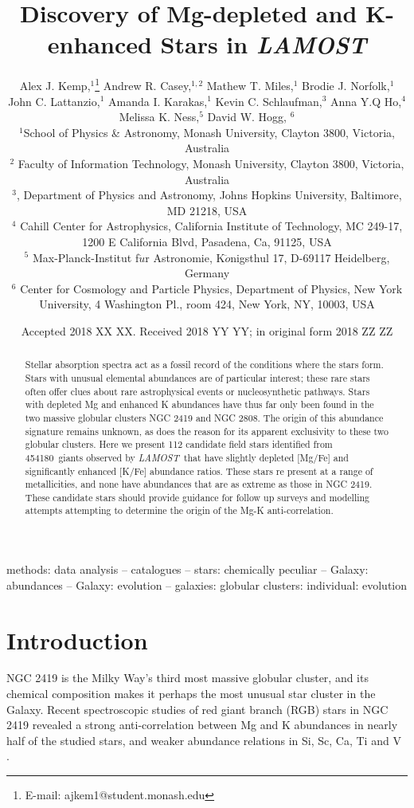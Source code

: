 \documentclass[a4paper,fleqn,usenatbib]{mnras}
\title[Mg-K anti-correlation in LAMOST]{Discovery of Mg-depleted and K-enhanced Stars in \textit{LAMOST}}
\author[Kemp et al.]{
Alex J. Kemp,$^{1}$\thanks{E-mail: ajkem1@student.monash.edu}
Andrew R. Casey,$^{1,2}$
Mathew T. Miles,$^{1}$
Brodie J. Norfolk,$^{1}$\newauthor
John C. Lattanzio,$^{1}$
Amanda I. Karakas,$^{1}$
Kevin C. Schlaufman,$^{3}$\newauthor
Anna Y.Q Ho,$^{4}$
Melissa K. Ness,$^{5}$
David W. Hogg, $^{6}$
\\
$^{1}$School of Physics \& Astronomy, Monash University, Clayton 3800, Victoria, Australia\\
$^{2}$ Faculty of Information Technology, Monash University, Clayton 3800, Victoria, Australia\\
$^{3}$, Department of Physics and Astronomy, Johns Hopkins University, Baltimore, MD 21218, USA\\
$^{4}$ Cahill Center for Astrophysics, California Institute of Technology, MC 249-17, 1200 E California Blvd, Pasadena, Ca, 91125, USA\\
$^{5}$ Max-Planck-Institut f$\ddot{u}$r Astronomie, K$\ddot{o}$nigsthul 17, D-69117 Heidelberg, Germany\\
$^{6}$ Center for Cosmology and Particle Physics, Department of Physics, New York University, 4 Washington Pl., room 424, New York, NY, 10003, USA\\
}
\date{Accepted 2018 XX XX. Received 2018 YY YY; in original form 2018 ZZ ZZ}
\newcommand{\LamostGiants}{454180}
\newcommand{\project}[1]{\emph{#1}}
\newcommand{\lamost}{\project{LAMOST}}
\begin{document}
\label{firstpage}
\pagerange{\pageref{firstpage}--\pageref{lastpage}}
\maketitle

\begin{abstract}

Stellar absorption spectra act as a fossil record of the conditions where the stars form. Stars with unusual elemental abundances are of particular interest; these rare stars often offer clues about rare astrophysical events or nucleosynthetic pathways. Stars with  depleted Mg and enhanced K abundances have thus far only been found in the two massive globular clusters NGC 2419 and NGC 2808. The origin of this abundance signature remains unknown, as does the reason for its apparent exclusivity to these two globular clusters. Here we present 112 candidate field stars identified from \LamostGiants \ giants observed by \lamost \ that have slightly depleted [Mg/Fe] and significantly enhanced [K/Fe] abundance ratios. These stars re present at a range of metallicities, and none have abundances that are as extreme as those in NGC 2419. These candidate stars should provide guidance for follow up surveys and modelling attempts attempting to determine the origin of the Mg-K anti-correlation.



\end{abstract}

\begin{keywords}
methods: data analysis -- catalogues -- stars: chemically peculiar -- Galaxy: abundances -- Galaxy: evolution -- galaxies: globular clusters: individual: evolution
\end{keywords}



\section{Introduction}
\label{sec:intro}
NGC 2419 is the Milky Way's third most massive globular cluster, and its chemical composition makes it perhaps the most unusual star cluster in the Galaxy. Recent spectroscopic studies of red giant branch (RGB) stars in NGC 2419 revealed a strong anti-correlation between Mg and K abundances in nearly half of the studied stars, and weaker abundance relations in Si, Sc, Ca, Ti and V \citep{mucciarelli2012,cohenkirby2012}.
\end{document}
